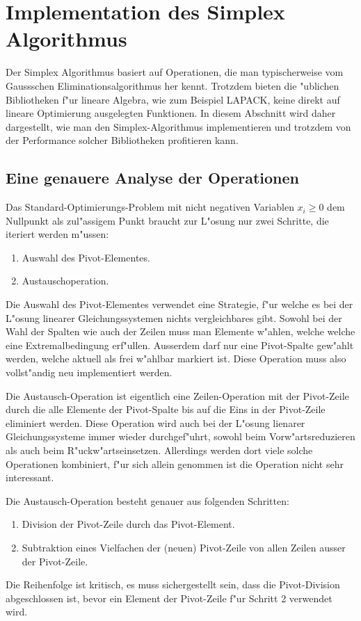 \chapter{Implementation des Simplex Algorithmus}

Der Simplex Algorithmus basiert auf Operationen, die man typischerweise
vom Gaussschen Eliminationsalgorithmus her kennt.
Trotzdem bieten die "ublichen Bibliotheken f"ur lineare Algebra,
wie zum Beispiel LAPACK, keine direkt auf lineare Optimierung
ausgelegten Funktionen.
In diesem Abschnitt wird daher dargestellt, wie man den Simplex-Algorithmus
implementieren und trotzdem von der Performance solcher
Bibliotheken profitieren kann.

\section{Eine genauere Analyse der Operationen}
Das Standard-Optimierungs-Problem mit nicht negativen Variablen $x_i\ge 0$
dem Nullpunkt als zul"assigem Punkt braucht zur L"osung nur zwei Schritte,
die iteriert werden m"ussen:
\begin{enumerate}
\item Auswahl des Pivot-Elementes.
\item Austauschoperation.
\end{enumerate}
Die Auswahl des Pivot-Elementes verwendet eine Strategie, f"ur welche es
bei der L"osung linearer Gleichungssystemen nichts vergleichbares gibt.
Sowohl bei der Wahl der Spalten wie auch der Zeilen muss man Elemente 
w"ahlen, welche welche eine Extremalbedingung erf"ullen. Ausserdem
darf nur eine Pivot-Spalte gew"ahlt werden, welche aktuell als
frei w"ahlbar markiert ist. Diese Operation muss also vollst"andig neu
implementiert werden.

Die Austausch-Operation ist eigentlich eine Zeilen-Operation mit der
Pivot-Zeile durch die alle Elemente der Pivot-Spalte bis auf die Eins
in der Pivot-Zeile eliminiert werden. Diese Operation wird auch
bei der L"osung lienarer Gleichungssysteme immer wieder durchgef"uhrt,
sowohl beim Vorw"artsreduzieren als auch beim R"uckw"artseinsetzen.
Allerdings werden dort viele solche Operationen kombiniert, f"ur sich
allein genommen ist die Operation nicht sehr interessant.

Die Austausch-Operation besteht genauer aus folgenden Schritten:
\begin{enumerate}
\item Division der Pivot-Zeile durch das Pivot-Element.
\item Subtraktion eines Vielfachen der (neuen) Pivot-Zeile von allen
Zeilen ausser der Pivot-Zeile.
\end{enumerate}
Die Reihenfolge ist kritisch, es muss sichergestellt sein, dass die
Pivot-Division abgeschlossen ist, bevor ein Element der Pivot-Zeile
f"ur Schritt 2 verwendet wird.

